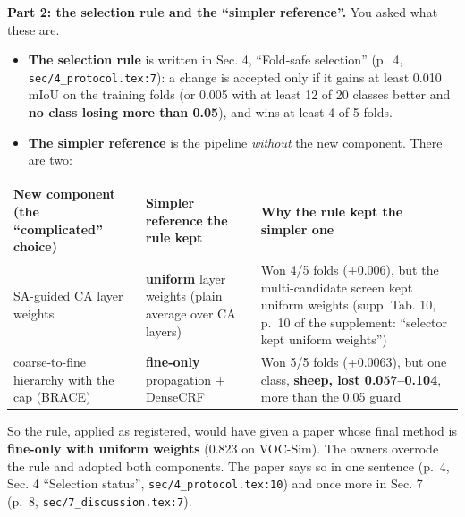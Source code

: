 \documentclass[
  10pt,
]{article}
\newcounter{none} %
\providecommand{\tightlist}{%
  \setlength{\itemsep}{0pt}\setlength{\parskip}{0pt}}
\begin{document}
\textbf{Part 2: the selection rule and the ``simpler reference''.} You
asked what these are.

\begin{itemize}
\tightlist
\item
  \textbf{The selection rule} is written in Sec. 4, ``Fold-safe
  selection'' (p.~4, \texttt{sec/4\_protocol.tex:7}): a change is
  accepted only if it gains at least 0.010 mIoU on the training folds
  (or 0.005 with at least 12 of 20 classes better and \textbf{no class
  losing more than 0.05}), and wins at least 4 of 5 folds.
\item
  \textbf{The simpler reference} is the pipeline \emph{without} the new
  component. There are two:
\end{itemize}

{\def\LTcaptype{none} %
\begin{longtable}[]{@{}
  >{\raggedright\arraybackslash}p{}
  >{\raggedright\arraybackslash}p{}
  >{\raggedright\arraybackslash}p{}@{}}
\toprule\noalign{}
\begin{minipage}[b]{\linewidth}\raggedright
New component (the ``complicated'' choice)
\end{minipage} & \begin{minipage}[b]{\linewidth}\raggedright
Simpler reference the rule kept
\end{minipage} & \begin{minipage}[b]{\linewidth}\raggedright
Why the rule kept the simpler one
\end{minipage} \\
\midrule\noalign{}
\endhead
\bottomrule\noalign{}
\endlastfoot
SA-guided CA layer weights & \textbf{uniform} layer weights (plain
average over CA layers) & Won 4/5 folds (+0.006), but the
multi-candidate screen kept uniform weights (supp. Tab. 10, p.~10 of the
supplement: ``selector kept uniform weights'') \\
coarse-to-fine hierarchy with the cap (BRACE) & \textbf{fine-only}
propagation + DenseCRF & Won 5/5 folds (+0.0063), but one class,
\textbf{sheep, lost 0.057--0.104}, more than the 0.05 guard \\
\end{longtable}
}

So the rule, applied as registered, would have given a paper whose final
method is \textbf{fine-only with uniform weights} (0.823 on VOC-Sim).
The owners overrode the rule and adopted both components. The paper says
so in one sentence (p.~4, Sec. 4 ``Selection status'',
\texttt{sec/4\_protocol.tex:10}) and once more in Sec. 7 (p.~8,
\texttt{sec/7\_discussion.tex:7}).
\end{document}
